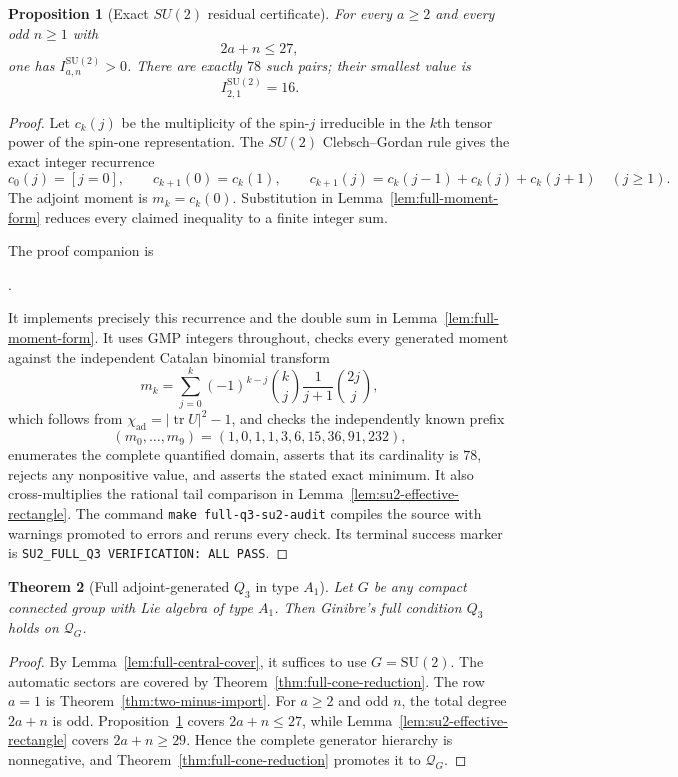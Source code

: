 \documentclass[11pt,reqno]{amsart}
\theoremstyle{plain}
\newtheorem{theorem}{Theorem}[section]
\newtheorem{proposition}[theorem]{Proposition}
\theoremstyle{definition}
\newcommand{\chiad}{\chi_{\mathrm{ad}}}
\newcommand{\Qcone}{\mathcal Q}
\begin{document}
\begin{proposition}[Exact $SU(2)$ residual certificate]
\label{prop:su2-residual-certificate}
For every $a\geq2$ and every odd $n\geq1$ with
\[
 2a+n\leq27,
\]
one has $I^{\mathrm{SU}(2)}_{a,n}>0$.  There are exactly $78$ such pairs;
their smallest value is
\[
 I^{\mathrm{SU}(2)}_{2,1}=16.
\]
\end{proposition}

\begin{proof}
Let $c_k(j)$ be the multiplicity of the spin-$j$ irreducible in the $k$th
tensor power of the spin-one representation.  The $SU(2)$
Clebsch--Gordan rule gives the exact integer recurrence
\[
 c_0(j)=[j=0],\qquad
 c_{k+1}(0)=c_k(1),\qquad
 c_{k+1}(j)=c_k(j-1)+c_k(j)+c_k(j+1)\quad(j\geq1).
\]
The adjoint moment is $m_k=c_k(0)$.  Substitution in
Lemma~\ref{lem:full-moment-form} reduces every claimed inequality to a
finite integer sum.

The proof companion is
\begin{center}
.
\end{center}
It implements precisely this recurrence and the double sum in
Lemma~\ref{lem:full-moment-form}.  It uses GMP integers throughout, checks
every generated moment against the independent Catalan binomial transform
\[
 m_k=\sum_{j=0}^k(-1)^{k-j}\binom kj
 \frac1{j+1}\binom{2j}{j},
\]
which follows from $\chiad=|\operatorname{tr}U|^2-1$, and checks
the independently known prefix
\[
 (m_0,\ldots,m_9)=(1,0,1,1,3,6,15,36,91,232),
\]
enumerates the complete quantified domain, asserts that its cardinality is
$78$, rejects any nonpositive value, and asserts the stated exact minimum.
It also cross-multiplies the rational tail comparison in
Lemma~\ref{lem:su2-effective-rectangle}.  The command
\texttt{make full-q3-su2-audit} compiles the source with warnings promoted to
errors and reruns every check.  Its terminal success marker is
\texttt{SU2\_FULL\_Q3 VERIFICATION: ALL PASS}.
\end{proof}

\begin{theorem}[Full adjoint-generated $Q_3$ in type $A_1$]
\label{thm:su2-full-cone}
Let $G$ be any compact connected group with Lie algebra of type $A_1$.
Then Ginibre's full condition $Q_3$ holds on $\Qcone_G$.
\end{theorem}

\begin{proof}
By Lemma~\ref{lem:full-central-cover}, it suffices to use $G=\mathrm{SU}(2)$.
The automatic sectors are covered by
Theorem~\ref{thm:full-cone-reduction}.  The row $a=1$ is
Theorem~\ref{thm:two-minus-import}.  For $a\geq2$ and odd $n$, the total degree
$2a+n$ is odd.  Proposition~\ref{prop:su2-residual-certificate} covers
$2a+n\leq27$, while Lemma~\ref{lem:su2-effective-rectangle} covers
$2a+n\geq29$.  Hence the complete generator hierarchy is nonnegative, and
Theorem~\ref{thm:full-cone-reduction} promotes it to $\Qcone_G$.
\end{proof}
\end{document}
